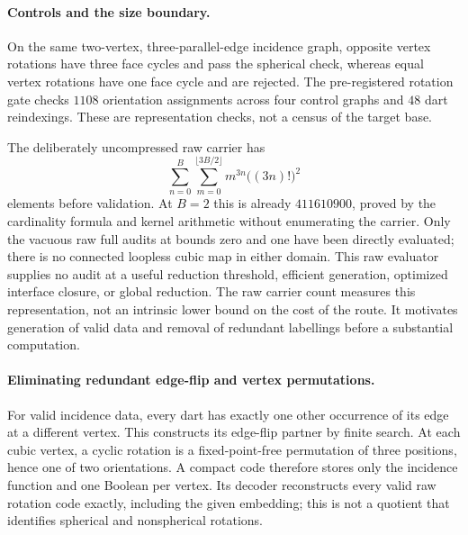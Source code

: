 \paragraph{Controls and the size boundary.}
On the same two-vertex, three-parallel-edge incidence graph, opposite vertex
rotations have three face cycles and pass the spherical check, whereas
equal vertex rotations have one face cycle and are rejected.
The pre-registered rotation gate checks $1108$ orientation assignments
across four control graphs and $48$ dart reindexings. These are
representation checks, not a census of the target base.

The deliberately uncompressed raw carrier has
\[
 \sum_{n=0}^{B}\sum_{m=0}^{\lfloor3B/2\rfloor}
               m^{3n}\bigl((3n)!\bigr)^2
\]
elements before validation. At $B=2$ this is already $411610900$, proved by
the cardinality formula and kernel arithmetic without enumerating the
carrier.
Only the vacuous raw full audits at bounds zero and one have been directly evaluated;
there is no connected loopless cubic map in either domain.
This raw evaluator supplies no audit at a useful reduction threshold,
efficient generation, optimized interface closure, or global reduction. The raw carrier count
measures this representation, not an intrinsic lower bound on the cost of
the route. It motivates generation of valid data and removal of redundant
labellings before a substantial computation.

\paragraph{Eliminating redundant edge-flip and vertex permutations.}
For valid incidence data, every dart has exactly one other occurrence of
its edge at a different vertex. This constructs its edge-flip partner by
finite search. At each cubic vertex, a cyclic rotation is a fixed-point-free
permutation of three positions, hence one of two orientations. A compact
code therefore stores only the incidence function and one Boolean per
vertex. Its decoder reconstructs every valid raw rotation code exactly,
including the given embedding; this is not a quotient that identifies
spherical and nonspherical rotations.

